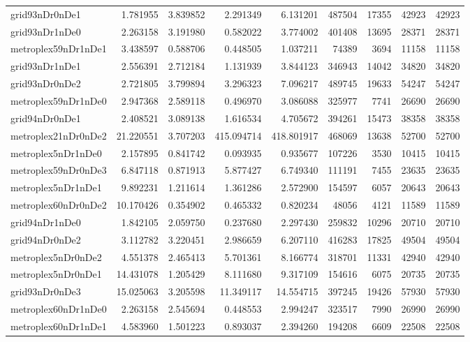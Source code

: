 \documentclass[../../../thesis.tex]{subfiles}
\begin{document}
\begin{longtable}{|l|r|r|r|r|r|r|r|r|}
grid93nDr0nDe1 & 1.781955 & 3.839852 & 2.291349 & 6.131201 & 487504 & 17355 & 42923 & 42923 \\
grid93nDr1nDe0 & 2.263158 & 3.191980 & 0.582022 & 3.774002 & 401408 & 13695 & 28371 & 28371 \\
metroplex59nDr1nDe1 & 3.438597 & 0.588706 & 0.448505 & 1.037211 & 74389 & 3694 & 11158 & 11158 \\
grid93nDr1nDe1 & 2.556391 & 2.712184 & 1.131939 & 3.844123 & 346943 & 14042 & 34820 & 34820 \\
grid93nDr0nDe2 & 2.721805 & 3.799894 & 3.296323 & 7.096217 & 489745 & 19633 & 54247 & 54247 \\
metroplex59nDr1nDe0 & 2.947368 & 2.589118 & 0.496970 & 3.086088 & 325977 & 7741 & 26690 & 26690 \\
grid94nDr0nDe1 & 2.408521 & 3.089138 & 1.616534 & 4.705672 & 394261 & 15473 & 38358 & 38358 \\
metroplex21nDr0nDe2 & 21.220551 & 3.707203 & 415.094714 & 418.801917 & 468069 & 13638 & 52700 & 52700 \\
metroplex5nDr1nDe0 & 2.157895 & 0.841742 & 0.093935 & 0.935677 & 107226 & 3530 & 10415 & 10415 \\
metroplex59nDr0nDe3 & 6.847118 & 0.871913 & 5.877427 & 6.749340 & 111191 & 7455 & 23635 & 23635 \\
metroplex5nDr1nDe1 & 9.892231 & 1.211614 & 1.361286 & 2.572900 & 154597 & 6057 & 20643 & 20643 \\
metroplex60nDr0nDe2 & 10.170426 & 0.354902 & 0.465332 & 0.820234 & 48056 & 4121 & 11589 & 11589 \\
grid94nDr1nDe0 & 1.842105 & 2.059750 & 0.237680 & 2.297430 & 259832 & 10296 & 20710 & 20710 \\
grid94nDr0nDe2 & 3.112782 & 3.220451 & 2.986659 & 6.207110 & 416283 & 17825 & 49504 & 49504 \\
metroplex5nDr0nDe2 & 4.551378 & 2.465413 & 5.701361 & 8.166774 & 318701 & 11331 & 42940 & 42940 \\
metroplex5nDr0nDe1 & 14.431078 & 1.205429 & 8.111680 & 9.317109 & 154616 & 6075 & 20735 & 20735 \\
grid93nDr0nDe3 & 15.025063 & 3.205598 & 11.349117 & 14.554715 & 397245 & 19426 & 57930 & 57930 \\
metroplex60nDr1nDe0 & 2.263158 & 2.545694 & 0.448553 & 2.994247 & 323517 & 7990 & 26990 & 26990 \\
metroplex60nDr1nDe1 & 4.583960 & 1.501223 & 0.893037 & 2.394260 & 194208 & 6609 & 22508 & 22508 \\

\end{longtable}
\end{document}
